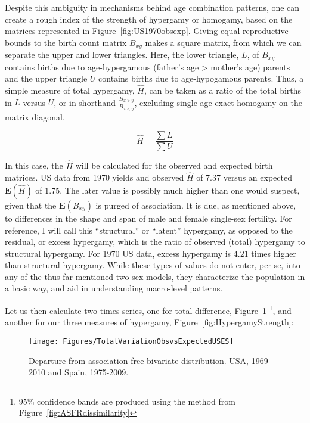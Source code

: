 Despite this ambiguity in mechanisms behind age combination patterns, one can
create a rough index of the strength of hypergamy or homogamy, based on the
matrices represented in Figure~\ref{fig:US1970obsexp}. Giving equal reproductive
bounds to the birth count matrix $B_{xy}$ makes a square matrix, from which we
can separate the upper and lower triangles. Here, the lower triangle, $L$,
of $B_{xy}$ contains births due to age-hypergamous (father's age > mother's
age) parents and the upper triangle $U$ contains births due to
age-hypogamous parents. Thus, a simple measure of total hypergamy, $\widehat{H}$, 
can be taken as a ratio of the total births in $L$ versus $U$, or in shorthand 
$\frac{B_{x>y}}{B_{x<y}}$, excluding single-age exact homogamy on the matrix diagonal.

\begin{equation}
\widehat{H} = \frac{\sum L}{\sum U} 
\end{equation}

In this case, the $\widehat{H}$ will be calculated for the observed and expected
birth matrices. US data from 1970 yields and observed $\widehat{H}$ of $7.37$
versus an expected $\textbf{E}(\widehat{H})$ of $1.75$. The later value is
possibly much higher than one would suspect, given that the $\textbf{E}(B_{xy})$
is purged of association. It is due, as mentioned above, to differences in the
shape and span of male and female single-sex fertility. For reference, I
will call this ``structural'' or ``latent'' hypergamy, as opposed to the
residual, or excess hypergamy, which is the ratio of observed (total) hypergamy to
structural hypergamy. For 1970 US data, excess hypergamy is $4.21$ times higher
than structural hypergamy. While these types of values do not enter, per se, 
into any of the thus-far mentioned two-sex models, they characterize the 
population in a basic way, and aid in understanding macro-level patterns. 

Let us then calculate two times series, one for total difference,
Figure~\ref{fig:Theta} \footnote{95\% confidence bands are produced
    using the method from Figure~\ref{fig:ASFRdissimilarity}}, and another for
    our three measures of hypergamy, Figure~\ref{fig:HypergamyStrength}:

\begin{figure}[!ht]
  \centering
    \caption{Departure from association-free bivariate distribution. USA,
    1969-2010 and Spain, 1975-2009.}
     \texttt{[image: Figures/TotalVariationObsvsExpectedUSES]}
     \label{fig:Theta}
\end{figure}

